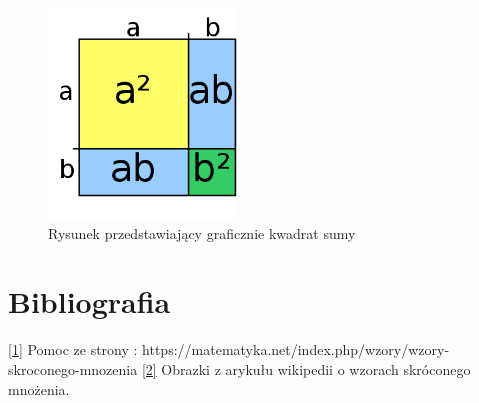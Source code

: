\documentclass[11pt]{article}
\begin{document}
\begin{figure}[ht]
\begin{center}
\includegraphics[width=5cm]{dd.png}
\caption{Rysunek przedstawiający graficznie kwadrat sumy}
\label{rys_model}
\end{center}
\end{figure}
\newpage
\section{Bibliografia}
\begin{thebibliography}{99}
\ref{1}
Pomoc ze strony : https://matematyka.net/index.php/wzory/wzory-skroconego-mnozenia
\ref{2}
Obrazki z arykułu wikipedii o wzorach skróconego mnożenia.
\end{thebibliography}
\end{document}
